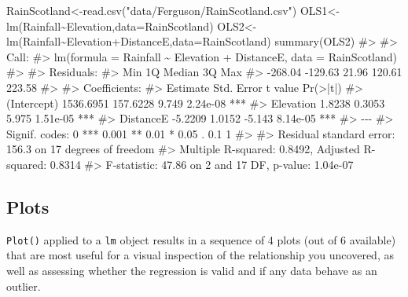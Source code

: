 \documentclass[
  letterpaper,
  DIV=11,
  numbers=noendperiod]{scrreprt}
\newenvironment{Shaded}{\begin{snugshade}}{\end{snugshade}}
\newcommand{\AttributeTok}[1]{\textcolor[rgb]{0.40,0.45,0.13}{#1}}
\newcommand{\CommentTok}[1]{\textcolor[rgb]{0.37,0.37,0.37}{#1}}
\newcommand{\FunctionTok}[1]{\textcolor[rgb]{0.28,0.35,0.67}{#1}}
\newcommand{\NormalTok}[1]{\textcolor[rgb]{0.00,0.23,0.31}{#1}}
\newcommand{\OtherTok}[1]{\textcolor[rgb]{0.00,0.23,0.31}{#1}}
\newcommand{\SpecialCharTok}[1]{\textcolor[rgb]{0.37,0.37,0.37}{#1}}
\newcommand{\StringTok}[1]{\textcolor[rgb]{0.13,0.47,0.30}{#1}}
\begin{document}
\begin{Shaded}
\begin{Highlighting}[]
\NormalTok{RainScotland}\OtherTok{\textless{}{-}}\FunctionTok{read.csv}\NormalTok{(}\StringTok{"data/Ferguson/RainScotland.csv"}\NormalTok{)}
\NormalTok{OLS1}\OtherTok{\textless{}{-}}\FunctionTok{lm}\NormalTok{(Rainfall}\SpecialCharTok{\textasciitilde{}}\NormalTok{Elevation,}\AttributeTok{data=}\NormalTok{RainScotland)}
\NormalTok{OLS2}\OtherTok{\textless{}{-}}\FunctionTok{lm}\NormalTok{(Rainfall}\SpecialCharTok{\textasciitilde{}}\NormalTok{Elevation}\SpecialCharTok{+}\NormalTok{DistanceE,}\AttributeTok{data=}\NormalTok{RainScotland)}
\FunctionTok{summary}\NormalTok{(OLS2)}
\CommentTok{\#\textgreater{} }
\CommentTok{\#\textgreater{} Call:}
\CommentTok{\#\textgreater{} lm(formula = Rainfall \textasciitilde{} Elevation + DistanceE, data = RainScotland)}
\CommentTok{\#\textgreater{} }
\CommentTok{\#\textgreater{} Residuals:}
\CommentTok{\#\textgreater{}     Min      1Q  Median      3Q     Max }
\CommentTok{\#\textgreater{} {-}268.04 {-}129.63   21.96  120.61  223.58 }
\CommentTok{\#\textgreater{} }
\CommentTok{\#\textgreater{} Coefficients:}
\CommentTok{\#\textgreater{}              Estimate Std. Error t value Pr(\textgreater{}|t|)    }
\CommentTok{\#\textgreater{} (Intercept) 1536.6951   157.6228   9.749 2.24e{-}08 ***}
\CommentTok{\#\textgreater{} Elevation      1.8238     0.3053   5.975 1.51e{-}05 ***}
\CommentTok{\#\textgreater{} DistanceE     {-}5.2209     1.0152  {-}5.143 8.14e{-}05 ***}
\CommentTok{\#\textgreater{} {-}{-}{-}}
\CommentTok{\#\textgreater{} Signif. codes:  0 \textquotesingle{}***\textquotesingle{} 0.001 \textquotesingle{}**\textquotesingle{} 0.01 \textquotesingle{}*\textquotesingle{} 0.05 \textquotesingle{}.\textquotesingle{} 0.1 \textquotesingle{} \textquotesingle{} 1}
\CommentTok{\#\textgreater{} }
\CommentTok{\#\textgreater{} Residual standard error: 156.3 on 17 degrees of freedom}
\CommentTok{\#\textgreater{} Multiple R{-}squared:  0.8492, Adjusted R{-}squared:  0.8314 }
\CommentTok{\#\textgreater{} F{-}statistic: 47.86 on 2 and 17 DF,  p{-}value: 1.04e{-}07}
\end{Highlighting}
\end{Shaded}

\subsection{Plots}\label{plots}

\texttt{Plot()} applied to a \texttt{lm} object results in a sequence of
4 plots (out of 6 available) that are most useful for a visual
inspection of the relationship you uncovered, as well as assessing
whether the regression is valid and if any data behave as an outlier.
\end{document}
